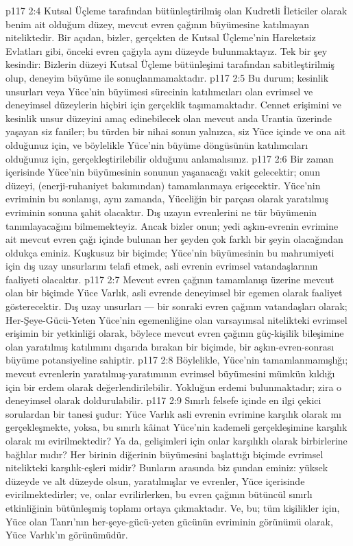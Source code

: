 \vs p117 2:4 Kutsal Üçleme tarafından bütünleştirilmiş olan Kudretli İleticiler olarak benim ait olduğum düzey, mevcut evren çağının büyümesine katılmayan niteliktedir. Bir açıdan, bizler, gerçekten de Kutsal Üçleme’nin Hareketsiz Evlatları gibi, önceki evren çağıyla aynı düzeyde bulunmaktayız. Tek bir şey kesindir: Bizlerin düzeyi Kutsal Üçleme bütünleşimi tarafından sabitleştirilmiş olup, deneyim büyüme ile sonuçlanmamaktadır.
\vs p117 2:5 Bu durum; kesinlik unsurları veya Yüce’nin büyümesi sürecinin katılımcıları olan evrimsel ve deneyimsel düzeylerin hiçbiri için gerçeklik taşımamaktadır. Cennet erişimini ve kesinlik unsur düzeyini amaç edinebilecek olan mevcut anda Urantia üzerinde yaşayan siz faniler; bu türden bir nihai sonun yalnızca, siz Yüce içinde ve ona ait olduğunuz için, ve böylelikle Yüce’nin büyüme döngüsünün katılımcıları olduğunuz için, gerçekleştirilebilir olduğunu anlamalısınız.
\vs p117 2:6 Bir zaman içerisinde Yüce’nin büyümesinin sonunun yaşanacağı vakit gelecektir; onun düzeyi, (enerji\hyp{}ruhaniyet bakımından) tamamlanmaya erişecektir. Yüce’nin evriminin bu sonlanışı, aynı zamanda, Yüceliğin bir parçası olarak yaratılmış evriminin sonuna şahit olacaktır. Dış uzayın evrenlerini ne tür büyümenin tanımlayacağını bilmemekteyiz. Ancak bizler onun; yedi aşkın\hyp{}evrenin evrimine ait mevcut evren çağı içinde bulunan her şeyden çok farklı bir şeyin olacağından oldukça eminiz. Kuşkusuz bir biçimde; Yüce’nin büyümesinin bu mahrumiyeti için dış uzay unsurlarını telafi etmek, asli evrenin evrimsel vatandaşlarının faaliyeti olacaktır.
\vs p117 2:7 Mevcut evren çağının tamamlanışı üzerine mevcut olan bir biçimde Yüce Varlık, asli evrende deneyimsel bir egemen olarak faaliyet gösterecektir. Dış uzay unsurları --- bir sonraki evren çağının vatandaşları olarak; Her\hyp{}Şeye\hyp{}Gücü\hyp{}Yeten Yüce’nin egemenliğine olan varsayımsal nitelikteki evrimsel erişimin bir yetkinliği olarak, böylece mevcut evren çağının güç\hyp{}kişilik bileşimine olan yaratılmış katılımını dışarıda bırakan bir biçimde, bir aşkın\hyp{}evren\hyp{}sonrası büyüme potansiyeline sahiptir.
\vs p117 2:8 Böylelikle, Yüce’nin tamamlanmamışlığı; mevcut evrenlerin yaratılmış\hyp{}yaratımının evrimsel büyümesini mümkün kıldığı için bir erdem olarak değerlendirilebilir. Yokluğun erdemi bulunmaktadır; zira o deneyimsel olarak doldurulabilir.
\vs p117 2:9 Sınırlı felsefe içinde en ilgi çekici sorulardan bir tanesi şudur: Yüce Varlık asli evrenin evrimine karşılık olarak mı gerçekleşmekte, yoksa, bu sınırlı kâinat Yüce’nin kademeli gerçekleşimine karşılık olarak mı evirilmektedir? Ya da, gelişimleri için onlar karşılıklı olarak birbirlerine bağlılar mıdır? Her birinin diğerinin büyümesini başlattığı biçimde evrimsel nitelikteki karşılık\hyp{}eşleri midir? Bunların arasında biz şundan eminiz: yüksek düzeyde ve alt düzeyde olsun, yaratılmışlar ve evrenler, Yüce içerisinde evirilmektedirler; ve, onlar evrilirlerken, bu evren çağının bütüncül sınırlı etkinliğinin bütünleşmiş toplamı ortaya çıkmaktadır. Ve, bu; tüm kişilikler için, Yüce olan Tanrı’nın her\hyp{}şeye\hyp{}gücü\hyp{}yeten gücünün evriminin görünümü olarak, Yüce Varlık’ın görünümüdür.
